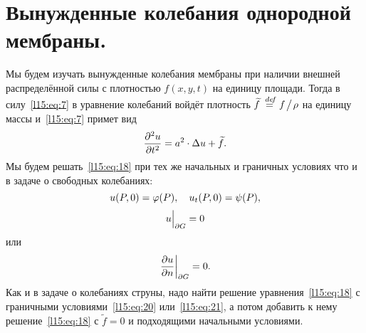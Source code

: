 \section{Вынужденные колебания однородной мембраны.}
\label{lecture15section2}
Мы будем изучать вынужденные колебания мембраны при наличии внешней распределённой силы с плотностью $f(x,y,t)$ на единицу площади. Тогда в силу~\eqref{l15:eq:7} в уравнение колебаний войдёт плотность $\widetilde{f}\stackrel{\hspace{0.09 cm}de\!f}{=} f\!\bigm/\!\rho$ на единицу массы и~\eqref{l15:eq:7} примет вид
\begin{equation}\label{l15:eq:18}
	\hfill\pdder{u}{t}=a^2\cdot\Delta u+\widetilde{f}.\hfill
\end{equation}
Мы будем решать~\eqref{l15:eq:18} при тех же начальных и граничных условиях что и в задаче о свободных колебаниях:
\begin{equation}\label{l15:eq:19}
	\hfill u(P,0)=\phi(P),\quad u_t(P,0)=\psi(P),\hfill
\end{equation} 
\begin{equation}\label{l15:eq:20}
	\hfill u\Big|_{\partial G}=0\hfill
\end{equation} 
или
\begin{equation}\label{l15:eq:21}
	\hfill \left. \pder{u}{n}\right|_{\partial G}=0.\hfill
\end{equation} 
Как и в задаче о колебаниях струны, надо найти решение уравнения~\eqref{l15:eq:18} с граничными условиями~\eqref{l15:eq:20} или~\eqref{l15:eq:21}, а потом добавить к нему решение~\eqref{l15:eq:18} с $\widetilde{f}=0$ и подходящими начальными условиями.

